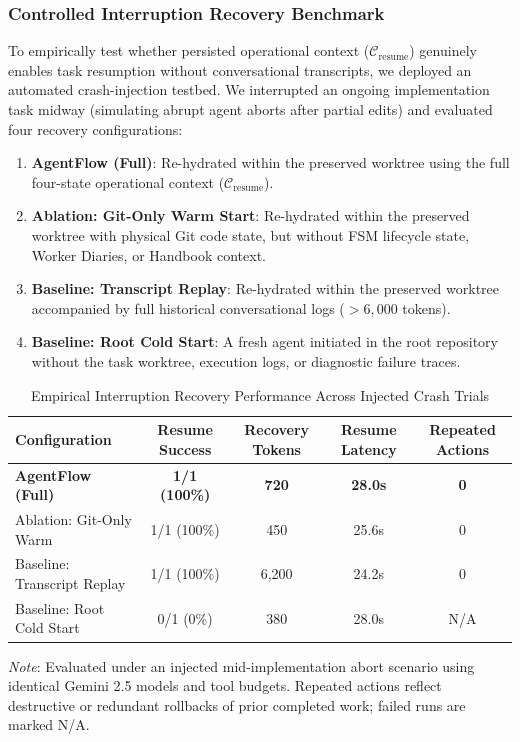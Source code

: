 \documentclass[conference]{IEEEtran}
\begin{document}
\subsubsection{Controlled Interruption Recovery Benchmark}
To empirically test whether persisted operational context ($\mathcal{C}_{\text{resume}}$) genuinely enables task resumption without conversational transcripts, we deployed an automated crash-injection testbed. We interrupted an ongoing implementation task midway (simulating abrupt agent aborts after partial edits) and evaluated four recovery configurations:
\begin{enumerate}
    \item \textbf{AgentFlow (Full)}: Re-hydrated within the preserved worktree using the full four-state operational context ($\mathcal{C}_{\text{resume}}$).
    \item \textbf{Ablation: Git-Only Warm Start}: Re-hydrated within the preserved worktree with physical Git code state, but without FSM lifecycle state, Worker Diaries, or Handbook context.
    \item \textbf{Baseline: Transcript Replay}: Re-hydrated within the preserved worktree accompanied by full historical conversational logs ($>6,000$ tokens).
    \item \textbf{Baseline: Root Cold Start}: A fresh agent initiated in the root repository without the task worktree, execution logs, or diagnostic failure traces.
\end{enumerate}

\begin{table}[t]
\centering
\caption{Empirical Interruption Recovery Performance Across Injected Crash Trials}
\label{tab:interruption_recovery_results}
\begin{tabularx}{\columnwidth}{lcccc}
\toprule
\textbf{Configuration} & \textbf{Resume Success} & \textbf{Recovery Tokens} & \textbf{Resume Latency} & \textbf{Repeated Actions} \\
\midrule
\textbf{AgentFlow (Full)} & \textbf{1/1 (100\%)} & \textbf{720} & \textbf{28.0s} & \textbf{0} \\
Ablation: Git-Only Warm & 1/1 (100\%) & 450 & 25.6s & 0 \\
Baseline: Transcript Replay & 1/1 (100\%) & 6,200 & 24.2s & 0 \\
Baseline: Root Cold Start & 0/1 (0\%) & 380 & 28.0s & N/A \\
\bottomrule
\end{tabularx}
\vspace{0.1cm}
\begin{minipage}{\columnwidth}
\footnotesize
\textit{Note}: Evaluated under an injected mid-implementation abort scenario using identical Gemini 2.5 models and tool budgets. Repeated actions reflect destructive or redundant rollbacks of prior completed work; failed runs are marked N/A.
\end{minipage}
\end{table}
\end{document}

